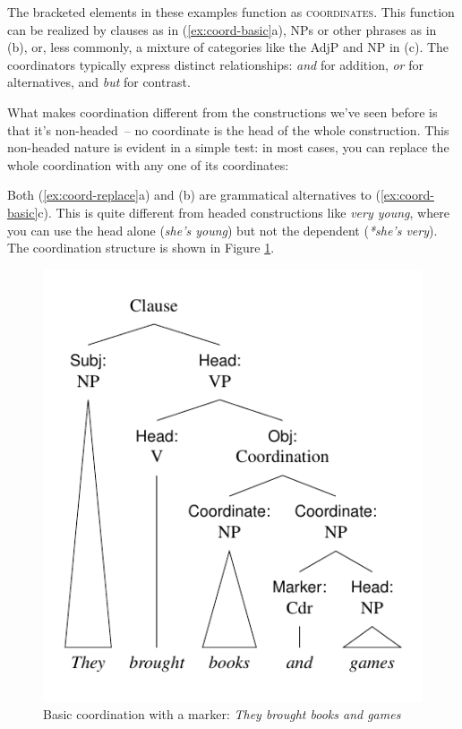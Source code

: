 \ea \label{ex:coord-basic}
    \z
\z

The bracketed elements in these examples function as \textsc{coordinates}. This function can be realized by clauses as in (\ref{ex:coord-basic}a), NPs or other phrases as in (b), or, less commonly, a mixture of categories like the AdjP and NP in (c). The coordinators typically express distinct relationships: \textit{and} for addition, \textit{or} for alternatives, and \textit{but} for contrast.

What makes coordination different from the constructions we've seen before is that it's non-headed~-- no coordinate is the head of the whole construction. This non-headed nature is evident in a simple test: in most cases, you can replace the whole coordination with any one of its coordinates:

\ea \label{ex:coord-replace}
    \z
\z

Both (\ref{ex:coord-replace}a) and (b) are grammatical alternatives to (\ref{ex:coord-basic}c). This is quite different from headed constructions like \textit{very young}, where you can use the head alone (\textit{she's young}) but not the dependent (\textit{*she's very}). The coordination structure is shown in Figure \ref{fig:coord-basic}.

\begin{figure}
    \centering
    \includegraphics[width=0.65\linewidth]{figures/the brought books and games.pdf}
    \caption{Basic coordination with a marker: \textit{They brought books and games}}\label{fig:coord-basic}
\end{figure}

